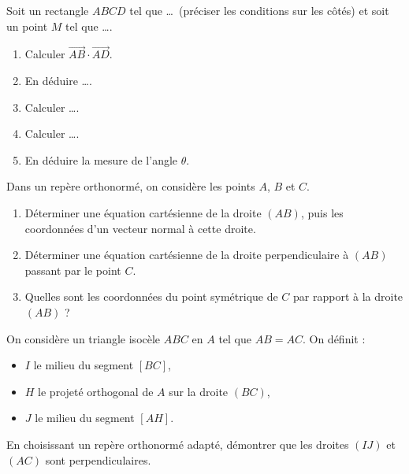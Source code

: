 \documentclass[11pt]{article}
\begin{document}
\newpage


\begin{exercice}
Soit un rectangle $ABCD$ tel que \ldots\ (préciser les conditions sur les côtés) et soit un point $M$ tel que \ldots. 
\begin{enumerate}
  \item Calculer $\vec{AB}\cdot\vec{AD}$.
  \item En déduire \ldots.
  \item Calculer \ldots.
  \item Calculer \ldots.
  \item En déduire la mesure de l'angle $\theta$.
\end{enumerate}
\end{exercice}

\begin{exercice}[2]
Dans un repère orthonormé, on considère les points $A$, $B$ et $C$. 
\begin{enumerate}
  \item Déterminer une équation cartésienne de la droite $(AB)$, puis les coordonnées d’un vecteur normal à cette droite.
  \item Déterminer une équation cartésienne de la droite perpendiculaire à $(AB)$ passant par le point $C$.
  \item Quelles sont les coordonnées du point symétrique de $C$ par rapport à la droite $(AB)$ ?
\end{enumerate}
\end{exercice}

\begin{exercice}[3]
On considère un triangle isocèle $ABC$ en $A$ tel que $AB=AC$. On définit :
\begin{itemize}
  \item $I$ le milieu du segment $[BC]$,
  \item $H$ le projeté orthogonal de $A$ sur la droite $(BC)$,
  \item $J$ le milieu du segment $[AH]$.
\end{itemize}
En choisissant un repère orthonormé adapté, démontrer que les droites $(IJ)$ et $(AC)$ sont perpendiculaires.
\end{exercice}
\end{document}
